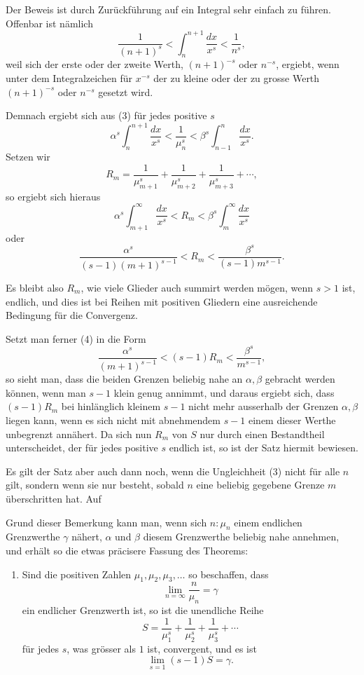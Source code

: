 \documentclass[11pt]{article}
\begin{document}
Der Beweis ist durch Zurückführung auf ein Integral sehr einfach zu führen. Offenbar ist nämlich
\[
\frac1{(n+1)^s}<\int_n^{n+1}\frac{dx}{x^s}<\frac1{n^s},
\]
weil sich der erste oder der zweite Werth, $(n+1)^{-s}$ oder $n^{-s}$, ergiebt, wenn unter dem Integralzeichen für $x^{-s}$ der zu kleine oder der zu grosse Werth $(n+1)^{-s}$ oder $n^{-s}$ gesetzt wird.

Demnach ergiebt sich aus (3) für jedes positive $s$
\[
\alpha^s\int_n^{n+1}\frac{dx}{x^s}<\frac1{\mu_n^s}<\beta^s\int_{n-1}^{n}\frac{dx}{x^s}.
\]
Setzen wir
\[
R_m=\frac1{\mu_{m+1}^s}+\frac1{\mu_{m+2}^s}+\frac1{\mu_{m+3}^s}+\cdots,
\]
so ergiebt sich hieraus
\[
\alpha^s\int_{m+1}^{\infty}\frac{dx}{x^s}<R_m<\beta^s\int_m^{\infty}\frac{dx}{x^s}
\]
oder
\begin{equation}
\frac{\alpha^s}{(s-1)(m+1)^{s-1}}<R_m<\frac{\beta^s}{(s-1)m^{s-1}} .
\tag{4}
\end{equation}

Es bleibt also $R_m$, wie viele Glieder auch summirt werden mögen, wenn $s>1$ ist, endlich, und dies ist bei Reihen mit positiven Gliedern eine ausreichende Bedingung für die Convergenz.

Setzt man ferner (4) in die Form
\[
\frac{\alpha^s}{(m+1)^{s-1}}<(s-1)R_m<\frac{\beta^s}{m^{s-1}},
\]
so sieht man, dass die beiden Grenzen beliebig nahe an $\alpha,\beta$ gebracht werden können, wenn man $s-1$ klein genug annimmt, und daraus ergiebt sich, dass $(s-1)R_m$ bei hinlänglich kleinem $s-1$ nicht mehr ausserhalb der Grenzen $\alpha,\beta$ liegen kann, wenn es sich nicht mit abnehmendem $s-1$ einem dieser Werthe unbegrenzt annähert. Da sich nun $R_m$ von $S$ nur durch einen Bestandtheil unterscheidet, der für jedes positive $s$ endlich ist, so ist der Satz hiermit bewiesen.

Es gilt der Satz aber auch dann noch, wenn die Ungleichheit (3) nicht für alle $n$ gilt, sondern wenn sie nur besteht, sobald $n$ eine beliebig gegebene Grenze $m$ überschritten hat. Auf

Grund dieser Bemerkung kann man, wenn sich $n:\mu_n$ einem endlichen Grenzwerthe $\gamma$ nähert, $\alpha$ und $\beta$ diesem Grenzwerthe beliebig nahe annehmen, und erhält so die etwas präcisere Fassung des Theorems:

\begin{enumerate}[label=\textbf{\arabic*.},leftmargin=2.2em,start=3]
\item Sind die positiven Zahlen $\mu_1,\mu_2,\mu_3,\ldots$ so beschaffen, dass
\[
\lim_{n=\infty}\frac{n}{\mu_n}=\gamma
\]
ein endlicher Grenzwerth ist, so ist die unendliche Reihe
\[
S=\frac1{\mu_1^s}+\frac1{\mu_2^s}+\frac1{\mu_3^s}+\cdots
\]
für jedes $s$, was grösser als $1$ ist, convergent, und es ist
\[
\lim_{s=1}(s-1)S=\gamma.
\]
\end{enumerate}
\end{document}
